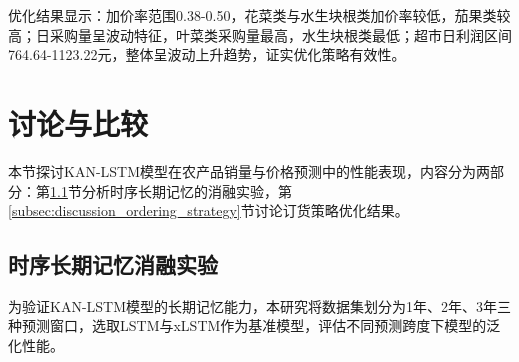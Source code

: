\documentclass[lang=cn,12pt,a4paper]{elegantpaper}
\begin{document}
优化结果显示：加价率范围0.38-0.50，花菜类与水生块根类加价率较低，茄果类较高；日采购量呈波动特征，叶菜类采购量最高，水生块根类最低；超市日利润区间764.64-1123.22元，整体呈波动上升趋势，证实优化策略有效性。
\section{讨论与比较}
\label{sec:discussion_comparison}
本节探讨KAN-LSTM模型在农产品销量与价格预测中的性能表现，内容分为两部分：第\ref{subsec:ablation_study}节分析时序长期记忆的消融实验，第\ref{subsec:discussion_ordering_strategy}节讨论订货策略优化结果。

\subsection{时序长期记忆消融实验}
\label{subsec:ablation_study}

为验证KAN-LSTM模型的长期记忆能力，本研究将数据集划分为1年、2年、3年三种预测窗口，选取LSTM与xLSTM作为基准模型，评估不同预测跨度下模型的泛化性能。
\end{document}
